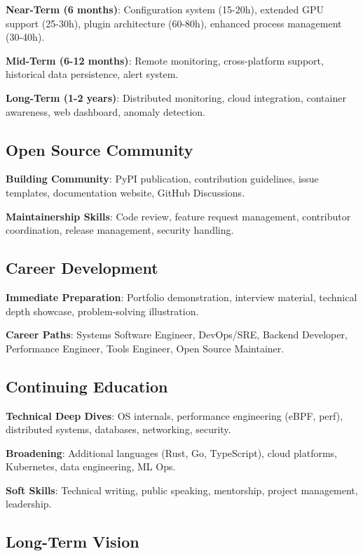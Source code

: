 \documentclass[12pt,a4paper,oneside]{report}
\begin{document}
\textbf{Near-Term (6 months)}: Configuration system (15-20h), extended GPU support (25-30h), plugin architecture (60-80h), enhanced process management (30-40h).

\textbf{Mid-Term (6-12 months)}: Remote monitoring, cross-platform support, historical data persistence, alert system.

\textbf{Long-Term (1-2 years)}: Distributed monitoring, cloud integration, container awareness, web dashboard, anomaly detection.

\subsection{Open Source Community}

\textbf{Building Community}: PyPI publication, contribution guidelines, issue templates, documentation website, GitHub Discussions.

\textbf{Maintainership Skills}: Code review, feature request management, contributor coordination, release management, security handling.

\subsection{Career Development}

\textbf{Immediate Preparation}: Portfolio demonstration, interview material, technical depth showcase, problem-solving illustration.

\textbf{Career Paths}: Systems Software Engineer, DevOps/SRE, Backend Developer, Performance Engineer, Tools Engineer, Open Source Maintainer.

\subsection{Continuing Education}

\textbf{Technical Deep Dives}: OS internals, performance engineering (eBPF, perf), distributed systems, databases, networking, security.

\textbf{Broadening}: Additional languages (Rust, Go, TypeScript), cloud platforms, Kubernetes, data engineering, ML Ops.

\textbf{Soft Skills}: Technical writing, public speaking, mentorship, project management, leadership.

\subsection{Long-Term Vision}
\end{document}
